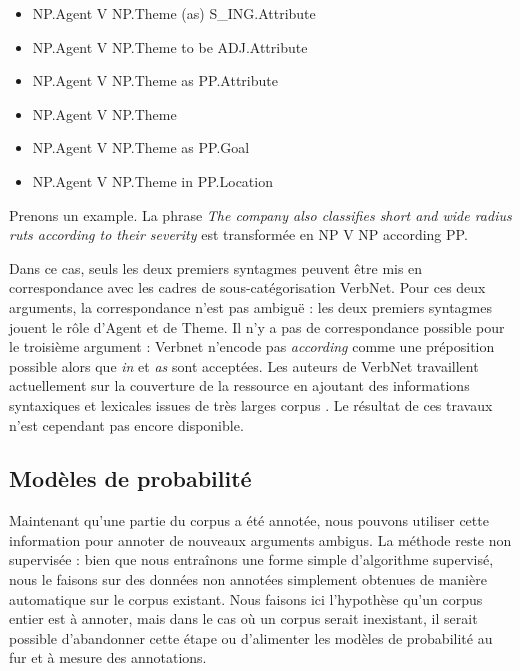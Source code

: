 \begin{itemize}
    \item NP.Agent V NP.Theme (as) S\_ING.Attribute
    \item NP.Agent V NP.Theme to be ADJ.Attribute
    \item NP.Agent V NP.Theme as PP.Attribute
    \item NP.Agent V NP.Theme
    \item NP.Agent V NP.Theme as PP.Goal
    \item NP.Agent V NP.Theme in PP.Location
\end{itemize}

Prenons un example. La phrase \emph{The company also classifies short and wide
radius ruts according to their severity} est transformée en NP V NP according
PP.

Dans ce cas, seuls les deux premiers syntagmes peuvent être mis en
correspondance avec les cadres de sous-catégorisation VerbNet. Pour ces deux
arguments, la correspondance n'est pas ambiguë : les deux premiers syntagmes
jouent le rôle d'Agent et de Theme. Il n'y a pas de correspondance possible
pour le troisième argument : Verbnet n'encode pas \emph{according} comme une
préposition possible alors que \emph{in} et \emph{as} sont acceptées. Les
auteurs de VerbNet travaillent actuellement sur la couverture de la ressource
en ajoutant des informations syntaxiques et lexicales issues de très larges
corpus \citep{bonial2013expanding}. Le résultat de ces travaux n'est cependant
pas encore disponible.


\subsection{Modèles de probabilité}
\label{subsec:probability}

Maintenant qu'une partie du corpus a été annotée, nous pouvons utiliser cette
information pour annoter de nouveaux arguments ambigus. La méthode reste non
supervisée : bien que nous entraînons une forme simple d'algorithme supervisé,
nous le faisons sur des données non annotées simplement obtenues de manière
automatique sur le corpus existant. Nous faisons ici l'hypothèse qu'un corpus
entier est à annoter, mais dans le cas où un corpus serait inexistant, il
serait possible d'abandonner cette étape ou d'alimenter les modèles de
probabilité au fur et à mesure des annotations.

